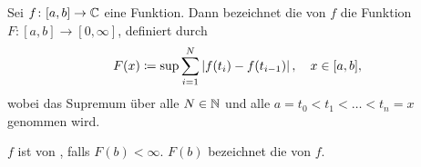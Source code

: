 Sei $f\colon [a,b]\to\mathbb{C}$ eine Funktion. Dann bezeichnet die  von $f$ die Funktion $F\colon[a,b]\to [0,\infty]$, definiert durch
\begin{equation*}
    F(x)\coloneqq \sup \sum_{i=1}^N \left|f(t_i) - f(t_{i-1})\right|, \quad x\in[a,b],
\end{equation*}
wobei das Supremum über alle $N\in\mathbb{N}$ und alle $a =t_0<t_1<\dots<t_n = x$ genommen wird.

$f$ ist von , falls $F(b)<\infty$. $F(b)$ bezeichnet die  von $f$.